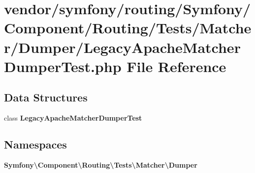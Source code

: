 \section{vendor/symfony/routing/\+Symfony/\+Component/\+Routing/\+Tests/\+Matcher/\+Dumper/\+Legacy\+Apache\+Matcher\+Dumper\+Test.php File Reference}
\label{_legacy_apache_matcher_dumper_test_8php}
\subsection*{Data Structures}
\begin{DoxyCompactItemize}
\item 
class {\bf Legacy\+Apache\+Matcher\+Dumper\+Test}
\end{DoxyCompactItemize}
\subsection*{Namespaces}
\begin{DoxyCompactItemize}
\item 
 {\bf Symfony\textbackslash{}\+Component\textbackslash{}\+Routing\textbackslash{}\+Tests\textbackslash{}\+Matcher\textbackslash{}\+Dumper}
\end{DoxyCompactItemize}
